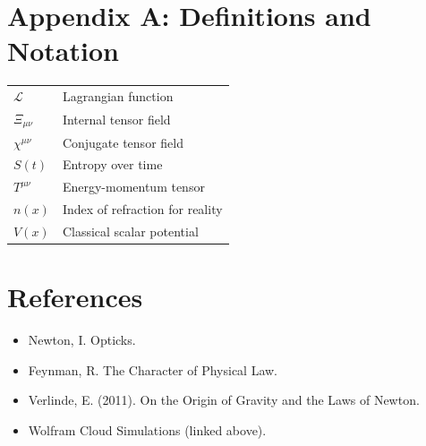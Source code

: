 \documentclass[12pt]{article}
\begin{document}
\section*{Appendix A: Definitions and Notation}

\begin{tabular}{ll}
\( \mathcal{L} \) & Lagrangian function \\
\( \Xi_{\mu\nu} \) & Internal tensor field \\
\( \chi^{\mu\nu} \) & Conjugate tensor field \\
\( S(t) \) & Entropy over time \\
\( T^{\mu\nu} \) & Energy-momentum tensor \\
\( n(x) \) & Index of refraction for reality \\
\( V(x) \) & Classical scalar potential \\
\end{tabular}

\section*{References}
\begin{itemize}
\item Newton, I. Opticks.
\item Feynman, R. The Character of Physical Law.
\item Verlinde, E. (2011). On the Origin of Gravity and the Laws of Newton.
\item Wolfram Cloud Simulations (linked above).
\end{itemize}
\end{document}
